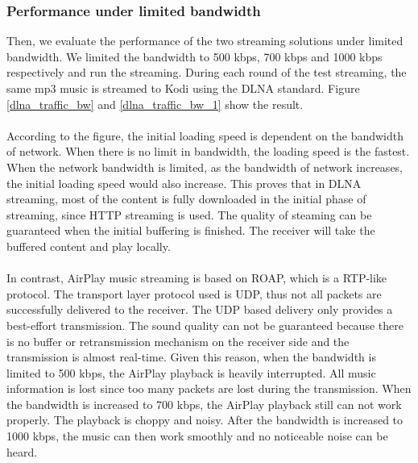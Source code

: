 \subsubsection{Performance under limited bandwidth\label{4_1_2}}
Then, we evaluate the performance of  the two streaming solutions under limited bandwidth. We limited the bandwidth to 500 kbps, 700 kbps and 1000 kbps respectively and run the streaming. 
During each round of the test streaming, the same mp3 music is streamed to Kodi
using the DLNA standard. Figure \ref{dlna_traffic_bw} and
\ref{dlna_traffic_bw_1} show the result.\\
\\
According to the figure, the initial loading speed is dependent on the bandwidth of network. When there is no limit in bandwidth, the loading speed is the fastest. When the network bandwidth is limited, as the bandwidth of network increases, the initial loading speed would also increase. This proves that in DLNA streaming, most of the content is fully downloaded in the initial phase of streaming,  since HTTP streaming is used. The quality of steaming can be guaranteed when the initial buffering is finished. The receiver will take the buffered content and play locally.\\
\\
In contrast, AirPlay music streaming is based on ROAP, which is a RTP-like protocol. The transport layer protocol used is UDP, thus not all packets are successfully delivered to the receiver. The UDP based delivery only provides a best-effort transmission. The sound quality can not be guaranteed because there is no buffer or retransmission mechanism on the receiver side and the transmission is almost real-time. Given this reason, when the bandwidth is limited to 500 kbps, the AirPlay playback is heavily interrupted. All music information is lost since too many packets are lost during the transmission. When the bandwidth is increased to 700 kbps, the AirPlay playback still can not work properly. The playback is choppy and noisy. After the bandwidth is increased to 1000 kbps, the music can then work smoothly and no noticeable noise can be heard.\\
\\
